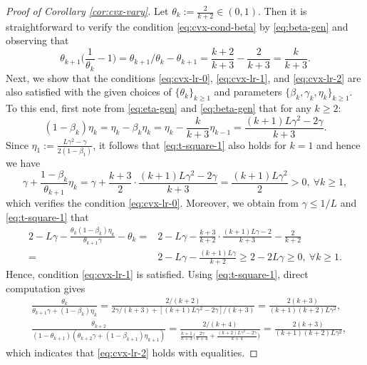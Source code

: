\documentclass[10pt]{article}
\numberwithin{equation}{section}
\theoremstyle{definition}
\begin{document}
\begin{proof}[Proof of Corollary \ref{cor:cvx-vary}]
    Let $\theta_k:=\frac{2}{k+2}\in(0,1)$. Then it is straightforward to verify the condition \eqref{eq:cvx-cond-beta} by \eqref{eq:beta-gen} and observing that
    \[
    \theta_{k+1}\Big(\frac{1}{\theta_k}-1\Big)= \theta_{k+1}/\theta_k-\theta_{k+1} = \frac{k+2}{k+3} - \frac{2}{k+3} = \frac{k}{k+3}.
    \]
    Next, we show that the conditions \eqref{eq:cvx-lr-0}, \eqref{eq:cvx-lr-1}, and \eqref{eq:cvx-lr-2} are also satisfied with the given choices of $\{\theta_k\}_{k\ge 1}$ and parameters $\{\beta_k, \gamma_k, \eta_k\}_{k\ge 1}$. To this end, first note from \eqref{eq:eta-gen} and \eqref{eq:beta-gen} that for any $k\ge 2$:
    \begin{equation}\label{eq:t-square-1}
        (1-\beta_k)\eta_k = \eta_k - \beta_k \eta_k=\eta_k-\frac{k}{k+3} \eta_{k-1}= \frac{(k+1) L \gamma^2-2 \gamma}{k+3}.
    \end{equation}
    Since $\eta_1:=\frac{L\gamma^2-\gamma}{2(1-\beta_1)}$, it follows that \eqref{eq:t-square-1} also holds for $k=1$ and hence we have
    \begin{equation}\label{eq:tilde_gamma>0}
        \gamma+\frac{1-\beta_k}{\theta_{k+1}}\eta_k = \gamma + \frac{k+3}{2}\cdot\frac{(k+1) L \gamma^2-2 \gamma}{k+3} = \frac{(k+1) L \gamma^2}{2}>0,~\forall k\ge 1,
    \end{equation}
    which verifies the condition \eqref{eq:cvx-lr-0}. Moreover, we obtain from $\gamma\leq 1/L$ and \eqref{eq:t-square-1} that
    \begin{align*}
        2-L \gamma-\frac{\theta_k(1-\beta_k)\eta_k}{\theta_{k+1}\gamma}-\theta_k=& 2-L \gamma - \frac{k+3}{k+2}\cdot\frac{(k+1) L \gamma-2}{k+3} - \frac{2}{k+2}\\
        =& 2-L\gamma -\frac{(k+1) L \gamma}{k+2} \ge 2-2L\gamma\ge 0,~\forall k\ge 1.
    \end{align*}
    Hence, condition \eqref{eq:cvx-lr-1} is satisfied. Using \eqref{eq:t-square-1}, direct computation gives 
    \begin{align*}
        &\frac{\theta_k}{\theta_{k+1}\gamma+(1-\beta_k)\eta_k} = \frac{2/(k+2)}{2\gamma/(k+3)+[(k+1)L\gamma^2-2\gamma]/(k+3)}= \frac{2(k+3)}{(k+1)(k+2)L\gamma^2},\\
        & \frac{\theta_{k+2}}{(1-\theta_{k+1})(\theta_{k+2}\gamma+(1-\beta_{k+1})\eta_{k+1})} = \frac{2/(k+4)}{\frac{k+1}{k+3}\Big(\frac{2\gamma}{k+4}+\frac{(k+2)L\gamma^2-2\gamma}{k+4}\Big)}=\frac{2(k+3)}{(k+1)(k+2)L\gamma^2},
    \end{align*}
    which indicates that \eqref{eq:cvx-lr-2} holds with equalities. 


\end{proof}
\end{document}
